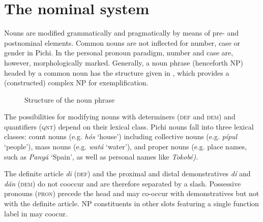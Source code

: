 \chapter{The nominal system}

Nouns are modified grammatically and pragmatically by means of pre- and postnominal elements. Common nouns are not inflected for number, case or gender in Pichi. In the personal pronoun paradigm, number and case are, however, morphologically marked. Generally, a noun phrase (henceforth NP) headed by a common noun has the structure given in , which provides a (constructed) complex NP for exemplification.

\begin{figure}
\caption{Structure of the noun phrase} 
\label{fig:key:5.1}
\end{figure}
The possibilities for modifying nouns with determiners (\textsc{def} and \textsc{dem}) and quantifiers (\textsc{qnt}) depend on their lexical class. Pichi nouns fall into three lexical classes: count nouns (e.g.\textit{ hós} ‘house’) including collective nouns (e.g. \textit{pípul} ‘people’), mass nouns (e.g. \textit{watá} ‘water’), and proper nouns (e.g. place names, such as \textit{Panyá} ‘Spain’, as well as personal names like \textit{Tokobé).} 


The definite article \textit{di} (\textsc{def}) and the proximal and distal demonstratives \textit{dí} and \textit{dán} (\textsc{dem}) do not cooccur and are therefore separated by a slash. Possessive pronouns (\textsc{pron}) precede the head and may co-occur with demonstratives but not with the definite article. NP constituents in other slots featuring a single function label in  may coocur. 



